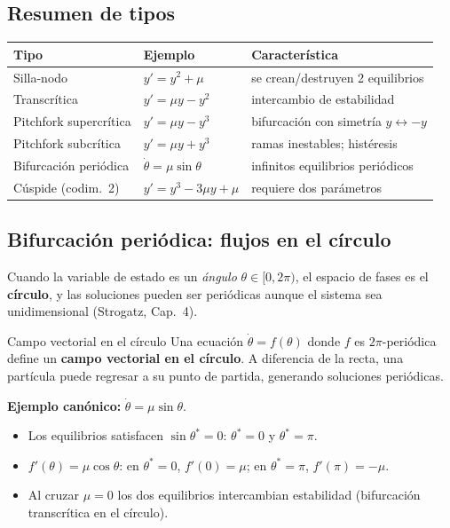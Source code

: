 \documentclass[11pt,letterpaper]{article}
\begin{document}
\subsection{Resumen de tipos}

\begin{center}
\begin{tabular}{lll}
\toprule
Tipo & Ejemplo & Característica\\
\midrule
Silla-nodo & $y'=y^2+\mu$ & se crean/destruyen 2 equilibrios\\
Transcrítica & $y'=\mu y-y^2$ & intercambio de estabilidad\\
Pitchfork supercrítica & $y'=\mu y-y^3$ & bifurcación con simetría $y\leftrightarrow -y$\\
Pitchfork subcrítica & $y'=\mu y+y^3$ & ramas inestables; histéresis\\
Bifurcación periódica & $\dot\theta=\mu\sin\theta$ & infinitos equilibrios periódicos\\
Cúspide (codim.~2) & $y'=y^3-3\mu y+\mu$ & requiere dos parámetros\\
\bottomrule
\end{tabular}
\end{center}

\subsection{Bifurcación periódica: flujos en el círculo}

Cuando la variable de estado es un \emph{ángulo} $\theta\in[0,2\pi)$, el espacio
de fases es el \textbf{círculo}, y las soluciones pueden ser periódicas aunque
el sistema sea unidimensional (Strogatz, Cap.~4).

\begin{definicion}{Campo vectorial en el círculo}{}
Una ecuación $\dot\theta=f(\theta)$ donde $f$ es $2\pi$-periódica define un
\textbf{campo vectorial en el círculo}. A diferencia de la recta, una partícula
puede regresar a su punto de partida, generando soluciones periódicas.
\end{definicion}

\textbf{Ejemplo canónico:} $\dot\theta=\mu\sin\theta$.
\begin{itemize}
  \item Los equilibrios satisfacen $\sin\theta^*=0$: $\theta^*=0$ y $\theta^*=\pi$.
  \item $f'(\theta)=\mu\cos\theta$: en $\theta^*=0$, $f'(0)=\mu$; en $\theta^*=\pi$, $f'(\pi)=-\mu$.
  \item Al cruzar $\mu=0$ los dos equilibrios intercambian estabilidad (bifurcación transcrítica en el círculo).
\end{itemize}
\end{document}

